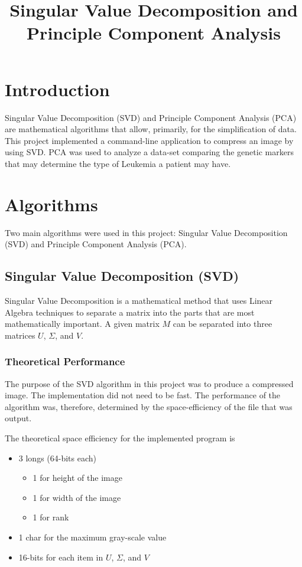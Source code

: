 \documentclass[conference]{IEEEtran}
\begin{document}
\title{Singular Value Decomposition and Principle Component Analysis}


\author{}

\maketitle


\section{Introduction}
Singular Value Decomposition (SVD) and Principle Component Analysis (PCA) are 
mathematical algorithms that allow, primarily, for the simplification of data.
This project implemented a command-line application to compress an image by 
using SVD. PCA was used to analyze a data-set comparing the genetic markers that
may determine the type of Leukemia a patient may have. 

\section{Algorithms}\label{algo}
Two main algorithms were used in this project: Singular Value Decomposition (SVD)
and Principle Component Analysis (PCA).

\subsection{Singular Value Decomposition (SVD)}
Singular Value Decomposition is a mathematical method that uses Linear Algebra
techniques to separate a matrix into the parts that are most mathematically 
important. A given matrix $M$ can be separated into three matrices $U$, 
$\Sigma$, and $V$.


\subsubsection{Theoretical Performance}
The purpose of the SVD algorithm in this project was to produce a compressed image. 
The implementation did not need to be fast. The performance of the algorithm was, 
therefore, determined by the space-efficiency of the file that was output. 

The theoretical space efficiency for the implemented program is 
\begin{itemize}
	\item 3 longs (64-bits each)
	\begin{itemize}
		\item 1 for height of the image
		\item 1 for width of the image
		\item 1 for rank
	\end{itemize}
	\item 1 char for the maximum gray-scale value
	\item 16-bits for each item in $U$, $\Sigma$, and $V$
\end{itemize}
\end{document}
